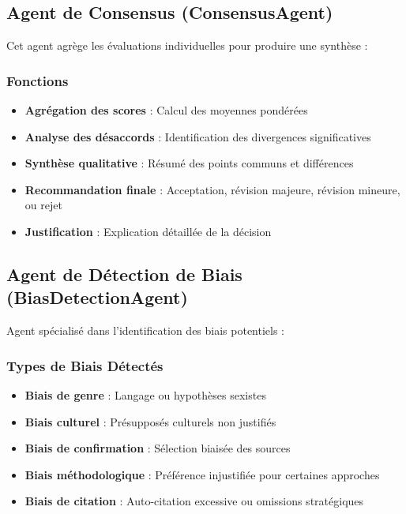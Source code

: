 \documentclass[12pt,a4paper]{article}
\begin{document}
\subsection{Agent de Consensus (ConsensusAgent)}

Cet agent agrège les évaluations individuelles pour produire une synthèse :

\subsubsection{Fonctions}
\begin{itemize}
    \item \textbf{Agrégation des scores} : Calcul des moyennes pondérées
    \item \textbf{Analyse des désaccords} : Identification des divergences significatives
    \item \textbf{Synthèse qualitative} : Résumé des points communs et différences
    \item \textbf{Recommandation finale} : Acceptation, révision majeure, révision mineure, ou rejet
    \item \textbf{Justification} : Explication détaillée de la décision
\end{itemize}

\subsection{Agent de Détection de Biais (BiasDetectionAgent)}

Agent spécialisé dans l'identification des biais potentiels :

\subsubsection{Types de Biais Détectés}
\begin{itemize}
    \item \textbf{Biais de genre} : Langage ou hypothèses sexistes
    \item \textbf{Biais culturel} : Présupposés culturels non justifiés
    \item \textbf{Biais de confirmation} : Sélection biaisée des sources
    \item \textbf{Biais méthodologique} : Préférence injustifiée pour certaines approches
    \item \textbf{Biais de citation} : Auto-citation excessive ou omissions stratégiques
\end{itemize}
\end{document}
